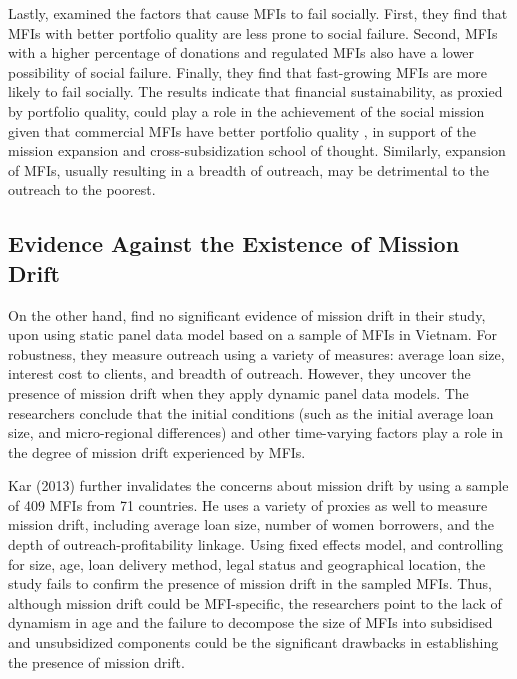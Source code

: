 \documentclass[a4paper,nobind]{templates/ociamthesis}
\begin{document}
Lastly, \textcite{dorfleitner2017microfinance} examined the factors that cause MFIs to fail socially. First, they find that MFIs with better portfolio quality are less prone to social failure. Second, MFIs with a higher percentage of donations and regulated MFIs also have a lower possibility of social failure. Finally, they find that fast-growing MFIs are more likely to fail socially. The results indicate that financial sustainability, as proxied by portfolio quality, could play a role in the achievement of the social mission given that commercial MFIs have better portfolio quality \autocite{tchakoute2010there}, in support of the mission expansion and cross-subsidization school of thought. Similarly, expansion of MFIs, usually resulting in a breadth of outreach, may be detrimental to the outreach to the poorest.

\hypertarget{evidence-against-the-existence-of-mission-drift}{%
\subsection{Evidence Against the Existence of Mission Drift}\label{evidence-against-the-existence-of-mission-drift}}

\noindent On the other hand, \textcite{abeysekera2014sustainability} find no significant evidence of mission drift in their study, upon using static panel data model based on a sample of MFIs in Vietnam. For robustness, they measure outreach using a variety of measures: average loan size, interest cost to clients, and breadth of outreach. However, they uncover the presence of mission drift when they apply dynamic panel data models. The researchers conclude that the initial conditions (such as the initial average loan size, and micro-regional differences) and other time-varying factors play a role in the degree of mission drift experienced by MFIs.

Kar (2013) further invalidates the concerns about mission drift by using a sample of 409 MFIs from 71 countries. He uses a variety of proxies as well to measure mission drift, including average loan size, number of women borrowers, and the depth of outreach-profitability linkage. Using fixed effects model, and controlling for size, age, loan delivery method, legal status and geographical location, the study fails to confirm the presence of mission drift in the sampled MFIs. Thus, although mission drift could be MFI-specific, the researchers point to the lack of dynamism in age and the failure to decompose the size of MFIs into subsidised and unsubsidized components could be the significant drawbacks in establishing the presence of mission drift.
\end{document}
